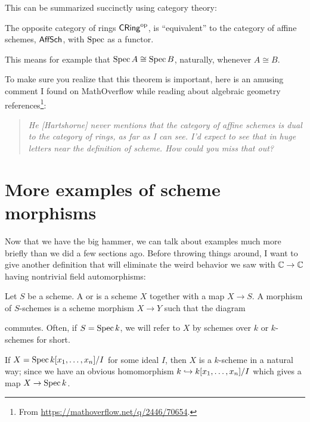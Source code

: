 This can be summarized succinctly using category theory:
\begin{corollary}
	The opposite category of rings $\mathsf{CRing}^{\mathrm{op}}$,
	is ``equivalent'' to the category of affine schemes, $\mathsf{AffSch}$,
	with $\operatorname{Spec}$ as a functor.
\end{corollary}
This means for example that $\operatorname{Spec} A \cong \operatorname{Spec} B$,
naturally, whenever $A \cong B$.

To make sure you realize that this theorem is important,
here is an amusing comment I found on MathOverflow
while reading about algebraic geometry
references\footnote{From \url{https://mathoverflow.net/q/2446/70654}.}:
\begin{quote}
	\small\sffamily\itshape
	He [Hartshorne] never mentions that the category of affine schemes
	is dual to the category of rings, as far as I can see.
	I'd expect to see that in huge letters
	near the definition of scheme.
	How could you miss that out?
\end{quote}

\section{More examples of scheme morphisms}
Now that we have the big hammer,
we can talk about examples much more briefly
than we did a few sections ago.
Before throwing things around,
I want to give another definition
that will eliminate the weird behavior we saw with
$\mathbb C \to \mathbb C$ having nontrivial field automorphisms:
\begin{definition}
	Let $S$ be a scheme.
	A  or  is a scheme $X$
	together with a map $X \to S$.
	A morphism of $S$-schemes is a scheme morphism $X \to Y$
	such that the diagram
	commutes.
	Often, if $S = \operatorname{Spec} k$, we will refer
	to $X$ by schemes over $k$ or $k$-schemes for short.
\end{definition}
\begin{example}
	[{$\Spec k[\dots]$}]
	If $X = \operatorname{Spec} k[x_1, \dots, x_n] / I$ for some ideal $I$,
	then $X$ is a $k$-scheme in a natural way;
	since we have an obvious homomorphism
	$k \hookrightarrow k[x_1, \dots, x_n] / I$
	which gives a map $X \to \operatorname{Spec} k$.
\end{example}

